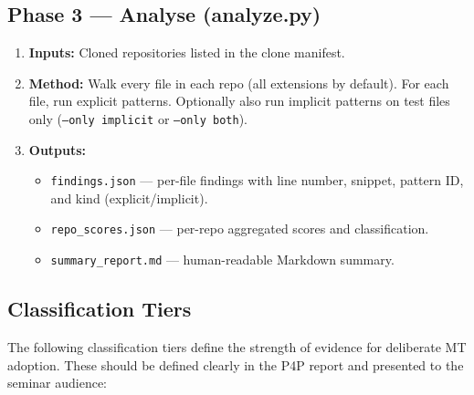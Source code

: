 \documentclass[12pt,a4paper]{article}
\begin{document}
\subsection{Phase 3 --- Analyse (analyze.py)}

\begin{enumerate}
  \item \textbf{Inputs:} Cloned repositories listed in the clone manifest.
  \item \textbf{Method:} Walk every file in each repo (all extensions by
        default). For each file, run explicit patterns. Optionally also run
        implicit patterns on test files only (\texttt{--only implicit} or
        \texttt{--only both}).
  \item \textbf{Outputs:}
    \begin{itemize}
      \item \texttt{findings.json} --- per-file findings with line number,
            snippet, pattern ID, and kind (explicit/implicit).
      \item \texttt{repo\_scores.json} --- per-repo aggregated scores and
            classification.
      \item \texttt{summary\_report.md} --- human-readable Markdown summary.
    \end{itemize}
\end{enumerate}

\subsection{Classification Tiers}
\label{sec:classification}

The following classification tiers define the strength of evidence for deliberate
MT adoption. These should be defined clearly in the P4P report and presented to
the seminar audience:
\end{document}
